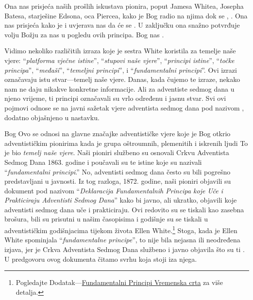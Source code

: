 Ona nas prisjeća naših prošlih iskustava pionira, poput Jamesa Whitea, Josepha Batesa, starješine Edsona, oca Piercea, kako je Bog radio na njima dok se , . Ona nas prisjeća kako je  i uvjerava nas da će se . U zaključku ona snažno potvrđuje volju Božju za nas u pogledu ovih principa. Bog nas .

Vidimo nekoliko različitih izraza koje je sestra White koristila za temelje naše vjere: “\textit{platforma vječne istine}”, “\textit{stupovi naše vjere}”, “\textit{principi istine}”, “\textit{točke principa}”, “\textit{međaši}”, “\textit{temeljni principi}”, i “\textit{fundamentalni principi}”. Ovi izrazi označavaju istu stvar—temelj naše vjere. Danas, kada čujemo te izraze, nekako nam ne daju nikakve konkretne informacije. Ali za adventiste sedmog dana u njeno vrijeme, ti principi označavali su vrlo određenu i jasnu stvar. Svi ovi pojmovi odnose se na javni sažetak vjere adventista sedmog dana pod nazivom , dodatno objašnjeno u nastavku.

Bog  Ovo se odnosi na glavne značajke adventističke vjere koje je Bog otkrio adventističkim pionirima  kada je grupa oštroumnih, plemenitih i iskrenih ljudi  To je bio \textit{temelj naše vjere}. Naši pioniri službeno su osnovali Crkvu Adventista Sedmog Dana 1863. godine i poučavali su te istine koje su nazivali “\textit{fundamentalni principi}.” No, adventisti sedmog dana često su bili pogrešno predstavljani u javnosti. Iz tog razloga, 1872. godine, naši pioniri objavili su dokument pod nazivom “\textit{Deklaracija Fundamentalnih Principa koje Uče i Prakticiraju Adventisti Sedmog Dana}” kako bi javno, ali ukratko, objavili koje  adventisti sedmog dana uče i prakticiraju. Ovi  redovito su se tiskali kao zasebna brošura, bili su prisutni u našim časopisima i godišnje su se tiskali u adventističkim godišnjacima tijekom života Ellen White.\footnote{Pogledajte Dodatak—\hyperref[appendix:timeline]{Fundamentalni Principi Vremenska crta} za više detalja.} Stoga, kada je Ellen White spominjala “\textit{fundamentalne principe}”, to nije bila nejasna ili neodređena izjava, jer je Crkva Adventista Sedmog Dana službeno i javno objavila što su ti . U predgovoru ovog dokumenta čitamo svrhu koja stoji iza njega.

